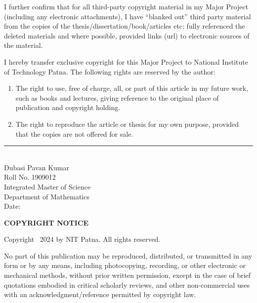 \documentclass[12pt,a4paper,oneside]{report}
\begin{document}
I further confirm that for all third-party copyright material in my Major Project (including any electronic attachments), I have ``blanked out'' third party material from the copies of the thesis/dissertation/book/articles etc; fully referenced the deleted materials and where possible, provided links (url) to electronic sources of the material.

I hereby transfer exclusive copyright for this Major Project to National Institute of Technology Patna. The following rights are reserved by the author:

\begin{enumerate}[label=\alph*)]
\item The right to use, free of charge, all, or part of this article in my future work, such as books and lectures, giving reference to the original place of publication and copyright holding.
\item The right to reproduce the article or thesis for my own purpose, provided that the copies are not offered for sale.
\end{enumerate}

\vspace{2cm}

\noindent
\rule{5cm}{0.5pt}\\
Dubasi Pavan Kumar\\
Roll No. 1909012\\
Integrated Master of Science\\
Department of Mathematics\\
Date:

\newpage
\begin{center}
\vspace*{3cm}
{\Large\bfseries COPYRIGHT NOTICE}
\end{center}

\vspace{2cm}

\begin{center}
Copyright \textcopyright\ 2024 by NIT Patna. All rights reserved.
\end{center}

\vspace{1cm}

No part of this publication may be reproduced, distributed, or transmitted in any form or by any means, including photocopying, recording, or other electronic or mechanical methods, without prior written permission, except in the case of brief quotations embodied in critical scholarly reviews, and other non-commercial uses with an acknowledgment/reference permitted by copyright law.
\end{document}
